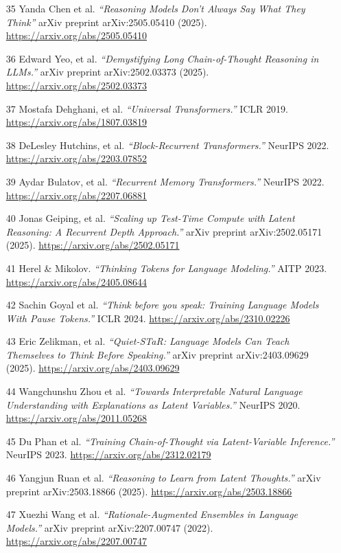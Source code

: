 \documentclass[12pt]{article}
\begin{document}
\begin{itemize}
    \item [35] Yanda Chen et al. \textit{``Reasoning Models Don’t Always Say What They Think''} arXiv preprint arXiv:2505.05410 (2025). \url{https://arxiv.org/abs/2505.05410}
    \item [36] Edward Yeo, et al. \textit{``Demystifying Long Chain-of-Thought Reasoning in LLMs.''} arXiv preprint arXiv:2502.03373 (2025). \url{https://arxiv.org/abs/2502.03373}
    \item [37] Mostafa Dehghani, et al. \textit{``Universal Transformers.''} ICLR 2019. \url{https://arxiv.org/abs/1807.03819}
    \item [38] DeLesley Hutchins, et al. \textit{``Block-Recurrent Transformers.''} NeurIPS 2022. \url{https://arxiv.org/abs/2203.07852}
    \item [39] Aydar Bulatov, et al. \textit{``Recurrent Memory Transformers.''} NeurIPS 2022. \url{https://arxiv.org/abs/2207.06881}
    \item [40] Jonas Geiping, et al. \textit{``Scaling up Test-Time Compute with Latent Reasoning: A Recurrent Depth Approach.''} arXiv preprint arXiv:2502.05171 (2025). \url{https://arxiv.org/abs/2502.05171}
    \item [41] Herel \& Mikolov. \textit{``Thinking Tokens for Language Modeling.''} AITP 2023. \url{https://arxiv.org/abs/2405.08644}
    \item [42] Sachin Goyal et al. \textit{``Think before you speak: Training Language Models With Pause Tokens.''} ICLR 2024. \url{https://arxiv.org/abs/2310.02226}
    \item [43] Eric Zelikman, et al. \textit{``Quiet-STaR: Language Models Can Teach Themselves to Think Before Speaking.''} arXiv preprint arXiv:2403.09629 (2025). \url{https://arxiv.org/abs/2403.09629}
    \item [44] Wangchunshu Zhou et al. \textit{``Towards Interpretable Natural Language Understanding with Explanations as Latent Variables.''} NeurIPS 2020. \url{https://arxiv.org/abs/2011.05268}
    \item [45] Du Phan et al. \textit{``Training Chain-of-Thought via Latent-Variable Inference.''} NeurIPS 2023. \url{https://arxiv.org/abs/2312.02179}
    \item [46] Yangjun Ruan et al. \textit{``Reasoning to Learn from Latent Thoughts.''} arXiv preprint arXiv:2503.18866 (2025). \url{https://arxiv.org/abs/2503.18866}
    \item [47] Xuezhi Wang et al. \textit{``Rationale-Augmented Ensembles in Language Models.''} arXiv preprint arXiv:2207.00747 (2022). \url{https://arxiv.org/abs/2207.00747}

\end{itemize}
\end{document}
